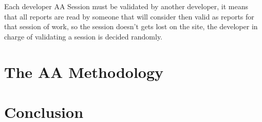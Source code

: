 \documentclass[letterpaper]{article}
\begin{document}

Each developer AA Session must be validated by another developer, it means that
all reports are read by someone that will consider then valid as reports for
that session of work, so the session doesn't gets lost on the site, the
developer in charge of validating a session is decided randomly.


\section{The AA Methodology}

\section{Conclusion}


%
%


\end{document}
